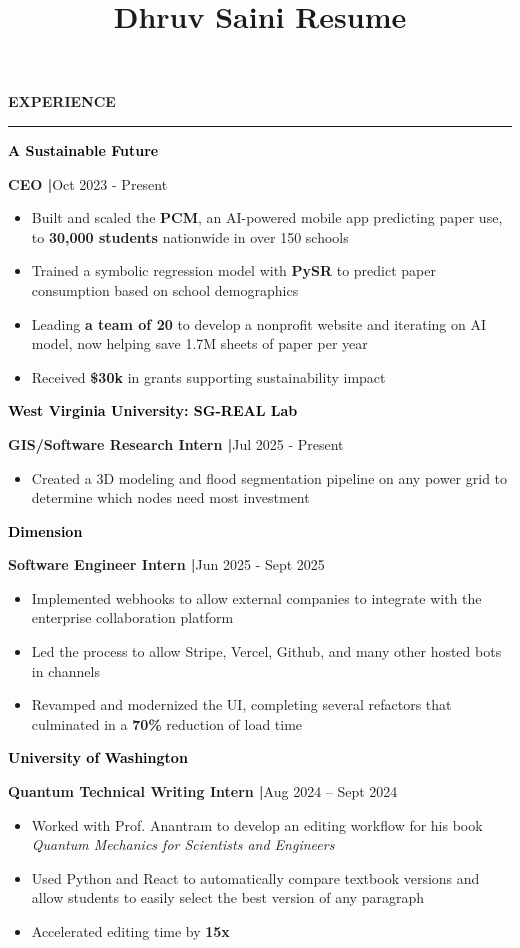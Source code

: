\documentclass[8pt,a4paper]{altacv}
\title{Dhruv Saini Resume}
\makeatletter
\newcommand{\resumebodysize}{\fontsize{8pt}{9pt}\selectfont}
\renewcommand{\divider}{\textcolor{body!30}{\hdashrule{\linewidth}{0.6pt}{0.285em}}\vspace{4.096pt}}
\renewcommand{\makecvheader}{%
  \begingroup
    \raggedright\color{emphasis}%
    {\Huge\bfseries\MakeUppercase{\@name}\par}
    \vspace{4.3pt}
    {\small\bfseries\@personalinfo\par}
  \endgroup
}
\renewcommand{\cvsection}[2][]{%
  \bigskip%
  \vspace{3.686pt}%
  \ifstrequal{#1}{}{}{\marginpar{\vspace*{\dimexpr1pt-\baselineskip}\raggedright}}%
  {\color{heading}\large\bfseries\MakeUppercase{#2}}\\[-1ex]\vspace{1.489pt}%
  {\color{heading}\rule{\linewidth}{2pt}\par}\medskip\vspace{1.179pt}
}
\renewcommand{\cvevent}[4]{%
  {\fontsize{9pt}{9pt}\selectfont\color{black}\hspace*{-0.282pt}#1\par}
  \ifstrequal{#2}{}{}{%
    \vspace{2.144pt}
    {\fontsize{9pt}{9pt}\selectfont\textbf{\color{accent}#2}\hspace{0.5em}\resumebodysize\faCalendar\hspace{0.5em}#3\par}%
  }%
  \vspace{2.145pt}\resumebodysize
}
\makeatother
\begin{document}
\makecvheader
\vskip0.917pt
\resumebodysize

\cvsection{Experience}
\vskip0.464pt

\cvevent{\textcolor{black}{\textbf{A Sustainable Future}}}{\textnormal{CEO |}}{Oct 2023 - Present}{}
\begin{itemize}
\item Built and scaled the \textbf{PCM}, an AI-powered mobile app predicting paper use, to \textbf{30,000 students} nationwide in over 150 schools
\item Trained a symbolic regression model with \textbf{PySR} to predict paper consumption based on school demographics
\item Leading \textbf{a team of 20} to develop a nonprofit website and iterating on AI model, now helping save 1.7M sheets of paper per year
\item Received \textbf{\$30k} in grants supporting sustainability impact
\end{itemize}
\divider

\cvevent{\textcolor{black}{\textbf{West Virginia University: SG-REAL Lab}}}{\textnormal{GIS/Software Research Intern |}}{Jul 2025 - Present}{}
\begin{itemize}
\item Created a 3D modeling and flood segmentation pipeline on any power grid to determine which nodes need most investment
\end{itemize}
\divider

\cvevent{\textcolor{black}{\textbf{Dimension}}}{\textnormal{Software Engineer Intern |}}{Jun 2025 - Sept 2025}{}
\begin{itemize}
\item Implemented webhooks to allow external companies to integrate with the enterprise collaboration platform
\item Led the process to allow Stripe, Vercel, Github, and many other hosted bots in channels
\item Revamped and modernized the UI, completing several refactors that culminated in a \textbf{70\%} reduction of load time
\end{itemize}
\divider

\cvevent{\textcolor{black}{\textbf{University of Washington}}}{\textnormal{Quantum Technical Writing Intern |}}{Aug 2024 – Sept 2024}{}
\begin{itemize}
\item Worked with Prof. Anantram to develop an editing workflow for his book \textit{Quantum Mechanics for Scientists and Engineers}
\item Used Python and React to automatically compare textbook versions and allow students to easily select the best version of any paragraph
\item Accelerated editing time by \textbf{15x}
\end{itemize}
\end{document}
